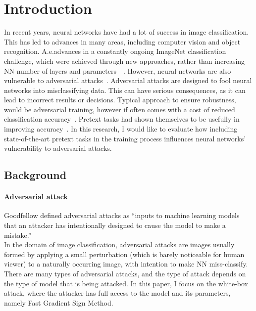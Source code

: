 \section{Introduction}

In recent years, neural networks have had a lot of success in image classification.
This has led to advances in many areas, including computer vision and object recognition.
A.e.advances in a constantly ongoing ImageNet classification challenge, which were achieved
through new approaches,
rather than increasing NN number of layers and parameters~\cite{russakovsky2015imagenet,DBLP:journals/corr/abs-1905-11946}~.
However, neural networks are also vulnerable to adversarial attacks~\cite{ilyas2019adversarial}.
Adversarial attacks are designed to fool neural networks into misclassifying data.
This can have serious consequences, as it can lead to incorrect results or decisions.
Typical approach to ensure robustness, would be adversarial training, however if often comes with a cost of
reduced classification accuracy~\cite{https://doi.org/10.48550/arxiv.1805.12152}.
Pretext tasks had shown themselves to be usefully in improving accuracy~\cite{kolesnikov2019revisiting}.
In this research, I would like to evaluate how including state-of-the-art pretext tasks in the training process
influences neural networks' vulnerability to adversarial attacks.

\subsection{Background}

\paragraph{Adversarial attack}
Goodfellow defined adversarial attacks as “inputs to machine learning models that an
attacker has intentionally designed to cause the model to make a mistake.”
~\cite{DBLP:journals/corr/abs-1802-08195} \\
In the domain of image classification, adversarial attacks are images usually formed by applying a small perturbation
(which is barely noticeable for human viewer) to a naturally occurring image, with intention to make NN miss-classify.
There are many types of adversarial attacks,
and the type of attack depends on the type of model that is being attacked.
In this paper, I focus on the white-box attack, where the attacker has full access to the model and its parameters,
namely Fast Gradient Sign Method.


